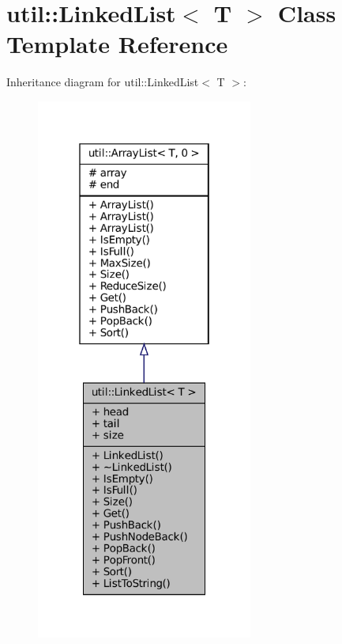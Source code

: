 \hypertarget{classutil_1_1LinkedList}{}\section{util\+:\+:Linked\+List$<$ T $>$ Class Template Reference}
\label{classutil_1_1LinkedList}


Inheritance diagram for util\+:\+:Linked\+List$<$ T $>$\+:
\nopagebreak
\begin{figure}[H]
\begin{center}
\leavevmode
\includegraphics[width=202pt]{classutil_1_1LinkedList__inherit__graph}
\end{center}
\end{figure}


